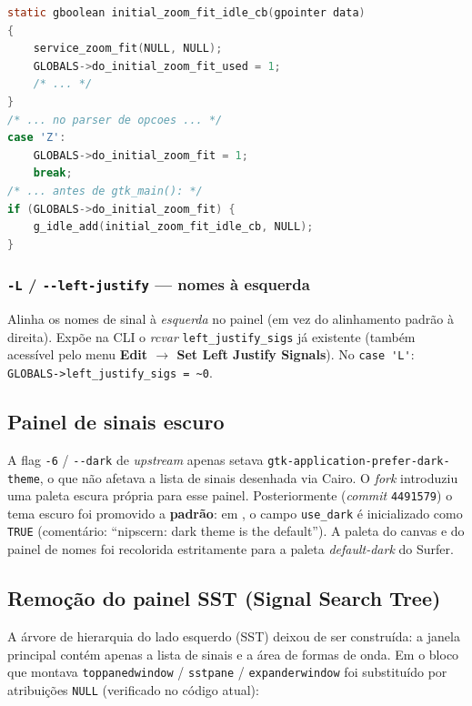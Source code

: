 \begin{lstlisting}[language=C,caption={Zoom-fit inicial em src/main.c (verificado).}]
static gboolean initial_zoom_fit_idle_cb(gpointer data)
{
    service_zoom_fit(NULL, NULL);
    GLOBALS->do_initial_zoom_fit_used = 1;
    /* ... */
}
/* ... no parser de opcoes ... */
case 'Z':
    GLOBALS->do_initial_zoom_fit = 1;
    break;
/* ... antes de gtk_main(): */
if (GLOBALS->do_initial_zoom_fit) {
    g_idle_add(initial_zoom_fit_idle_cb, NULL);
}
\end{lstlisting}

\subsubsection{\lstinline|-L| / \lstinline|--left-justify| — nomes à esquerda}

Alinha os nomes de sinal à \emph{esquerda} no painel (em vez do alinhamento padrão
à direita). Expõe na CLI o \emph{rcvar} \lstinline|left_justify_sigs| já existente
(também acessível pelo menu \textbf{Edit $\rightarrow$ Set Left Justify Signals}). No
\lstinline|case 'L'|: \lstinline|GLOBALS->left_justify_sigs = ~0|.

\subsection{Painel de sinais escuro}
\label{sec:cap10-gtkwave-darkpanel}

A flag \lstinline|-6| / \lstinline|--dark| de \emph{upstream} apenas setava
\lstinline|gtk-application-prefer-dark-theme|, o que não afetava a lista de sinais
desenhada via Cairo. O \emph{fork} introduziu uma paleta escura própria para esse
painel. Posteriormente (\emph{commit} \lstinline|4491579|) o tema escuro foi
promovido a \textbf{padrão}: em , o campo \lstinline|use_dark|
é inicializado como \lstinline|TRUE| (comentário: \enquote{nipscern: dark theme is
the default}). A paleta do canvas e do painel de nomes foi recolorida estritamente
para a paleta \emph{default-dark} do Surfer.

\subsection{Remoção do painel SST (Signal Search Tree)}
\label{sec:cap10-gtkwave-sst}

A árvore de hierarquia do lado esquerdo (SST) deixou de ser construída: a janela
principal contém apenas a lista de sinais e a área de formas de onda. Em
 o bloco que montava \lstinline|toppanedwindow| /
\lstinline|sstpane| / \lstinline|expanderwindow| foi substituído por atribuições
\lstinline|NULL| (verificado no código atual):

